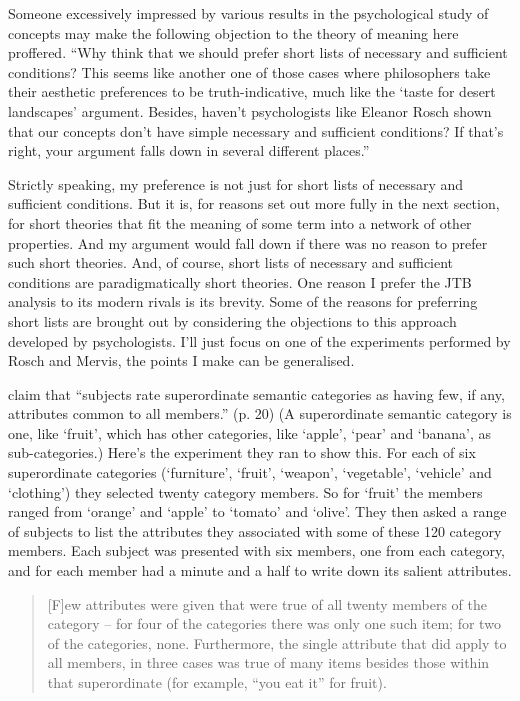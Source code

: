 Someone excessively impressed by various results in the psychological study of concepts may make the following objection to the theory of meaning here proffered. ``Why think that we should prefer short lists of necessary and sufficient conditions? This seems like another one of those cases where philosophers take their aesthetic preferences to be truth\nobreakdash-indicative, much like the `taste for desert landscapes' argument. Besides, haven't psychologists like Eleanor Rosch shown that our concepts don't have simple necessary and sufficient conditions? If that's right, your argument falls down in several different places.''

Strictly speaking, my preference is not just for short lists of necessary and sufficient conditions. But it is, for reasons set out more fully in the next section, for short theories that fit the meaning of some term into a network of other properties. And my argument would fall down if there was no reason to prefer such short theories. And, of course, short lists of necessary and sufficient conditions are paradigmatically short theories. One reason I prefer the JTB analysis to its modern rivals is its brevity. Some of the reasons for preferring short lists are brought out by considering the objections to this approach developed by psychologists. I'll just focus on one of the experiments performed by Rosch and Mervis, the points I make can be generalised. 

\citet{Rosch1975} claim that ``subjects rate superordinate semantic categories as having few, if any, attributes common to all members.'' (p. 20) (A superordinate semantic category is one, like `fruit', which has other categories, like `apple', `pear' and `banana', as sub\nobreakdash-categories.) Here's the experiment they ran to show this. For each of six superordinate categories (`furniture', `fruit', `weapon', `vegetable', `vehicle' and `clothing') they selected twenty category members. So for `fruit' the members ranged from `orange' and `apple' to `tomato' and `olive'. They then asked a range of subjects to list the attributes they associated with some of these 120 category members. Each subject was presented with six members, one from each category, and for each member had a minute and a half to write down its salient attributes.

\begin{quote}
[F]ew attributes were given that were true of all twenty members of the category -- for four of the categories there was only one such item; for two of the categories, none. Furthermore, the single attribute that did apply to all members, in three cases was true of many items besides those within that superordinate (for example, ``you eat it'' for fruit). \citet{Rosch1975}
\end{quote}

